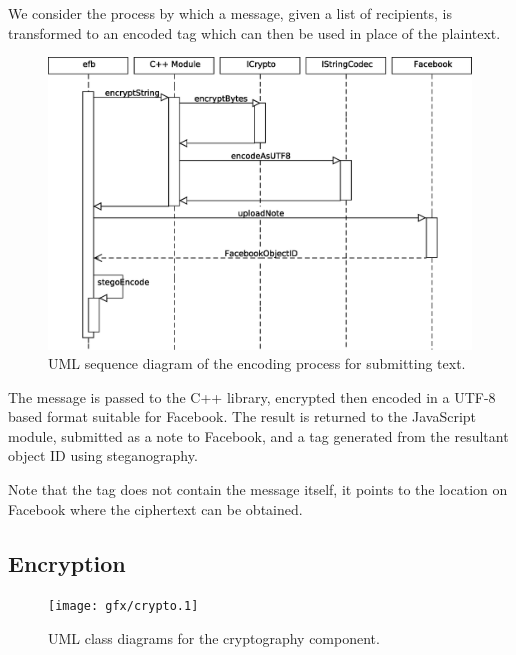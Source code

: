 We consider the process by which a message, given a list of recipients, is transformed to an encoded tag which can then be used in place of the plaintext. 

    \begin{figure}[tb]
        \begin{center}
                \includegraphics[width=12cm]{gfx/text-seq.eps}
            \caption{UML sequence diagram of the encoding process for submitting text.}
            \label{tikz:text}
        \end{center}
    \end{figure}

The message is passed to the C++ library, encrypted then encoded in a UTF-8 based format suitable for Facebook. The result is returned to the JavaScript module, submitted as a note to Facebook, and a tag generated from the resultant object ID using steganography.

Note that the tag does not contain the message itself, it points to the location on Facebook where the ciphertext can be obtained.

\subsection{Encryption}
\label{ssec:encrypt}

    \begin{figure}[tb]
        \begin{center}
                \texttt{[image: gfx/crypto.1]}
            \caption{UML class diagrams for the cryptography component.}
            \label{uml:crypto}
        \end{center}
    \end{figure}
    
